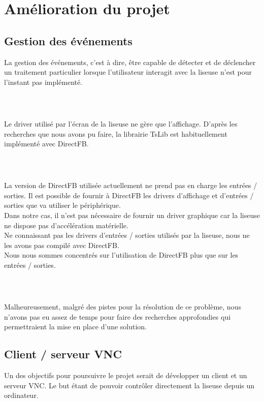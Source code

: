 \chapter{Amélioration du projet}


\section{Gestion des événements}
La gestion des événements, c'est à dire, être capable de détecter et de déclencher un traitement particulier lorsque l'utilisateur interagit avec la liseuse n'est pour l'instant pas implémenté.
\paragraph*{~}
Le driver utilisé par l'écran de la liseuse ne gère que l'affichage. D'après les recherches que nous avons pu faire, la librairie TsLib est habituellement implémenté avec DirectFB.
\paragraph*{~}
La version de DirectFB utilisée actuellement ne prend pas en charge les entrées / sorties. Il est possible de fournir à DirectFB les drivers d'affichage et d'entrées / sorties que va utiliser le périphérique.\\Dans notre cas, il n'est pas nécessaire de fournir un driver graphique car la liseuse ne dispose pas d'accélération matérielle.\\Ne connaissant pas les drivers d'entrées / sorties utilisés par la liseuse, nous ne les avons pas compilé avec DirectFB.\\Nous nous sommes concentrés sur l'utilisation de DirectFB plus que sur les entrées / sorties.
\paragraph*{~}
Malheureusement, malgré des pistes pour la résolution de ce problème, nous n'avons pas eu assez de temps pour faire des recherches approfondies qui permettraient la mise en place d'une solution.


\section{Client / serveur VNC}

Un des objectifs pour poursuivre le projet serait de développer un client et un serveur VNC. Le but étant de pouvoir contrôler directement la liseuse depuis un ordinateur.


